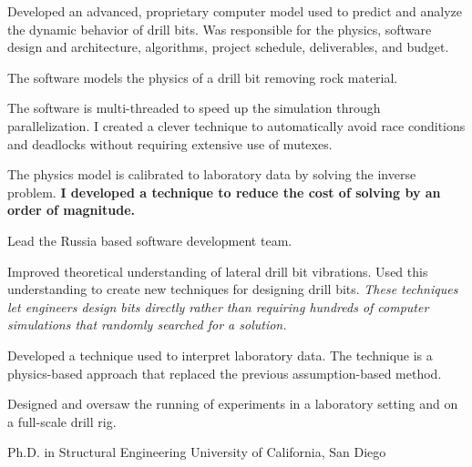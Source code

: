 \documentclass{leresume}
\begin{document}
		\begin{bulletedlist}
			
		\item 
					Developed an advanced, proprietary computer model used to predict and analyze the dynamic behavior of drill bits.  Was responsible for the physics, software design and architecture, algorithms, project schedule, deliverables, and budget.
					
		\begin{bulletedlist}
			
		\item 
							The software models the physics of a drill bit removing rock material.
						
		\item 
							The software is multi-threaded to speed up the simulation through parallelization.  I created a clever technique to automatically avoid race conditions and deadlocks without requiring extensive use of mutexes.
						
		\item 
							The physics model is calibrated to laboratory data by solving the inverse problem.  
		\textbf{I developed a technique to reduce the cost of solving by an order of magnitude.}
	
		\item Lead the Russia based software development team.
		\end{bulletedlist}
	
		\item Improved theoretical understanding of lateral drill bit vibrations.  Used this understanding to create new techniques for designing drill bits.  
		\textit{These techniques let engineers design bits directly rather than requiring hundreds of computer simulations that randomly searched for a solution.}
	
		\item Developed a technique used to interpret laboratory data.  The technique is a physics-based approach that replaced the previous assumption-based method.
		\item Designed and oversaw the running of experiments in a laboratory setting and on a full-scale drill rig.
		\end{bulletedlist}
	

	
                {Ph.D. in Structural Engineering}
                {University of California, San Diego}
		
\end{document}
